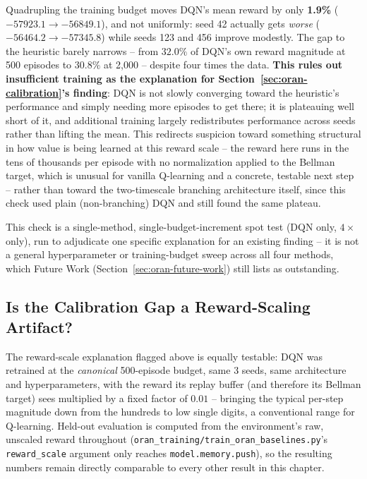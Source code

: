 Quadrupling the training budget moves DQN's mean reward by only
\textbf{1.9\%} ($-57923.1 \to -56849.1$), and not uniformly: seed 42
actually gets \emph{worse} ($-56464.2 \to -57345.8$) while seeds 123 and
456 improve modestly. The gap to the heuristic barely narrows -- from
$32.0\%$ of DQN's own reward magnitude at 500 episodes to $30.8\%$ at
2{,}000 -- despite four times the data. \textbf{This rules out
insufficient training as the explanation for Section~\ref{sec:oran-calibration}'s
finding}: DQN is not slowly converging toward the heuristic's
performance and simply needing more episodes to get there; it is
plateauing well short of it, and additional training largely redistributes
performance across seeds rather than lifting the mean. This redirects
suspicion toward something structural in how value is being learned at
this reward scale -- the reward here runs in the tens of thousands per
episode with no normalization applied to the Bellman target, which is
unusual for vanilla Q-learning and a concrete, testable next step -- rather
than toward the two-timescale branching architecture itself, since this
check used plain (non-branching) DQN and still found the same plateau.

This check is a single-method, single-budget-increment spot test (DQN
only, $4\times$ only), run to adjudicate one specific explanation for an
existing finding -- it is not a general hyperparameter or training-budget
sweep across all four methods, which Future Work
(Section~\ref{sec:oran-future-work}) still lists as outstanding.

\subsection{Is the Calibration Gap a Reward-Scaling Artifact?}
\label{sec:oran-reward-scale-check}

The reward-scale explanation flagged above is equally testable: DQN was
retrained at the \emph{canonical} 500-episode budget, same 3 seeds, same
architecture and hyperparameters, with the reward its replay buffer (and
therefore its Bellman target) sees multiplied by a fixed factor of
$0.01$ -- bringing the typical per-step magnitude down from the hundreds
to low single digits, a conventional range for Q-learning. Held-out
evaluation is computed from the environment's raw, unscaled reward
throughout (\texttt{oran\_training/train\_oran\_baselines.py}'s
\texttt{reward\_scale} argument only reaches
\texttt{model.memory.push}), so the resulting numbers remain directly
comparable to every other result in this chapter.

